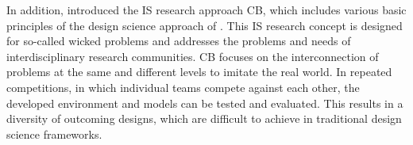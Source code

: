 In addition,  introduced the IS research approach CB,
which includes various basic principles of the design science approach of .
This IS research concept is designed for so-called wicked problems and addresses the problems and needs of interdisciplinary
research communities. CB focuses on the interconnection of problems at the same and different levels to imitate the real world.
In repeated competitions, in which individual teams compete against each other, the developed environment and models
can be tested and evaluated. This results in a diversity of outcoming designs, which are difficult to achieve in
traditional design science frameworks.

\clearpage